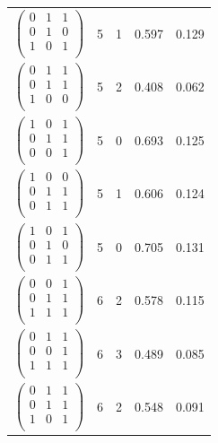 \documentclass{amsart}
\theoremstyle{definition}
\theoremstyle{remark}
\numberwithin{equation}{section}
\begin{document}
\begin{longtable}{ c || c | c | c | c }
$\begin{pmatrix}
0 & 1 & 1\\
0 & 1 & 0\\
1 & 0 & 1\\
\end{pmatrix}$ & 5 & 1 & 0.597 & 0.129\\
$\begin{pmatrix}
0 & 1 & 1\\
0 & 1 & 1\\
1 & 0 & 0\\
\end{pmatrix}$ & 5 & 2 & 0.408 & 0.062\\
$\begin{pmatrix}
1 & 0 & 1\\
0 & 1 & 1\\
0 & 0 & 1\\
\end{pmatrix}$ & 5 & 0 & 0.693 & 0.125\\
$\begin{pmatrix}
1 & 0 & 0\\
0 & 1 & 1\\
0 & 1 & 1\\
\end{pmatrix}$ & 5 & 1 & 0.606 & 0.124\\
$\begin{pmatrix}
1 & 0 & 1\\
0 & 1 & 0\\
0 & 1 & 1\\
\end{pmatrix}$ & 5 & 0 & 0.705 & 0.131\\
$\begin{pmatrix}
0 & 0 & 1\\
0 & 1 & 1\\
1 & 1 & 1\\
\end{pmatrix}$ & 6 & 2 & 0.578 & 0.115\\
$\begin{pmatrix}
0 & 1 & 1\\
0 & 0 & 1\\
1 & 1 & 1\\
\end{pmatrix}$ & 6 & 3 & 0.489 & 0.085\\
$\begin{pmatrix}
0 & 1 & 1\\
0 & 1 & 1\\
1 & 0 & 1\\
\end{pmatrix}$ & 6 & 2 & 0.548 & 0.091\\

\end{longtable}
\end{document}
